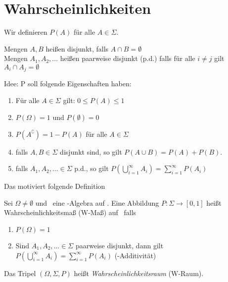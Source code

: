\section{Wahrscheinlichkeiten}

Wir definieren $P(A)$ für alle $A \in \Sigma$.
\begin{definition}
    Mengen $A, B$ heißen disjunkt, falls $A\cap B = \emptyset$\\
    Mengen $A_1, A_2, \dots$ heißen paarweise disjunkt (p.d.) falls für alle $i \neq j$ gilt
    $A_i \cap A_j = \emptyset$
\end{definition}

Idee: P soll folgende Eigenschaften haben:
\begin{enumerate}
    \item Für alle $A\in \Sigma$ gilt: $0 \leq P(A)\leq 1$
    \item $P(\Omega) = 1$ und $P(\emptyset) = 0$
    \item $P(A^\complement) = 1-P(A)$ für alle $A\in \Sigma$
    \item falls $A,B\in\Sigma$ disjunkt sind, so gilt
          $P(A\cup B) = P(A) + P(B)$.
    \item falls $A_1, A_2,\dots \in \Sigma$ p.d., so gilt
          $P(\bigcup\limits_{i=1}^\infty A_i) = \sum_{i=1}^\infty P(A_i)$
\end{enumerate}

Das motiviert folgende Definition

\begin{definition}[Wahrscheinlichkeitsmaß]
    Sei $\Omega \neq \emptyset$ und \tS\ eine \ts-Algebra auf \tO.
    Eine Abbildung $P: \Sigma \to [0,1]$ heißt Wahrscheinlichkeitsmaß (W-Maß) auf \tS\ falls
    \begin{enumerate}
        \item $P(\Omega) = 1$
        \item Sind $A_1, A_2,\dots \in \Sigma$ paarweise disjunkt, dann gilt
              $P\left(\bigcup_{i=1}^\infty A_i\right) = \sum_{i=1}^\infty P(A_i)$
              (\ts-Additivität)
    \end{enumerate}
\end{definition}
\noindent
Das Tripel $\left( \Omega, \Sigma, P\right)$ heißt \emph{Wahrscheinlichkeitsraum} (W-Raum).
